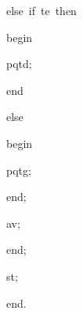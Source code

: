 {\pagebreak[3] 
\vspace{\neglskip}\mbox{\blc  \blk\blk\blk\idt  \mcl else\idt \ \mcl if\idt \ te\ \mcl then\idt }\par 
\vspace{\neglskip}\mbox{\blc  \blk\blk\blk\blk\idt  \mcl begin\idt }\par 
\vspace{\neglskip}\mbox{\blc  \blk\blk\blk\blk\blk\idt  pqtd$;$\ }\par 
\vspace{\neglskip}\mbox{\blc  \blk\blk\blk\blk\idt  \mcl end\idt }\par 
\pagebreak[3] 
\vspace{\neglskip}\mbox{\blc  \blk\blk\blk\idt  \mcl else\idt }\par 
\vspace{\neglskip}\mbox{\blc  \blk\blk\blk\blk\idt  \mcl begin\idt }\par 
\vspace{\neglskip}\mbox{\blc  \blk\blk\blk\blk\blk\idt  pqtg$;$\ }\par 
\vspace{\neglskip}\mbox{\blc  \blk\blk\blk\blk\idt  \mcl end\idt $;$}\par 
\vspace{\neglskip}\mbox{\blc  \blk\blk\blk\idt  av$;$\ }\par 
\vspace{\neglskip}\mbox{\blc  \blk\blk\idt  \mcl end\idt $;$}\par 
\vspace{\neglskip}\mbox{\blc  \blk\idt  st$;$}\par 
\vspace{\neglskip}\mbox{\blc  \idt  \mcl end\idt $.$}\par 

\medskip }

